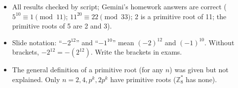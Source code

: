 \begin{fixbox}
\begin{itemize}
  \item All results checked by script; Gemini's homework answers are correct ($5^{10} \equiv 1 \pmod{11}$; $11^{20} \equiv 22 \pmod{33}$; 2 is a primitive root of 11; the primitive roots of 5 are 2 and 3).
  \item Slide notation: ``$-2^{12}$'' and ``$-1^{10}$'' mean $(-2)^{12}$ and $(-1)^{10}$. Without brackets, $-2^{12} = -(2^{12})$. Write the brackets in exams.
  \item The general definition of a primitive root (for any $n$) was given but not explained. Only $n = 2, 4, p^k, 2p^k$ have primitive roots ($\mathbb{Z}_8^*$ has none).
\end{itemize}
\end{fixbox}
